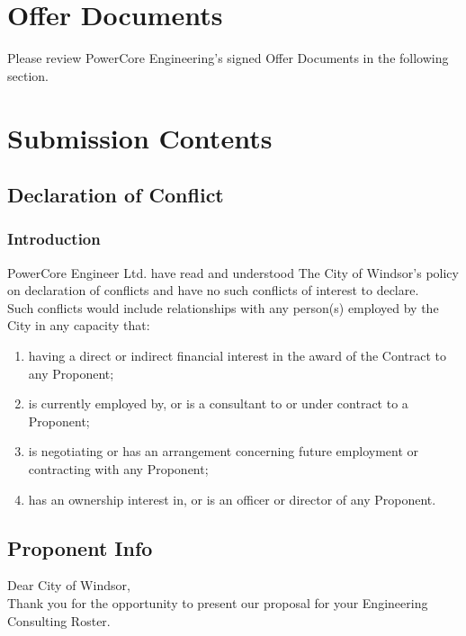 

\section{Offer Documents}
Please review PowerCore Engineering's signed Offer Documents in the following section. 


\section{Submission Contents}
\subsection{Declaration of Conflict}
\label{Sub:DOC}
\subsubsection{Introduction}
\label{Sub:DOC:intro}
PowerCore Engineer Ltd. have read and understood The City of Windsor's policy on declaration of conflicts and have no such conflicts of interest to declare.\\

Such conflicts would include relationships with any person(s) employed by the City in any capacity that:

\begin{enumerate}
	\item having a direct or indirect financial interest in the award of the Contract to any Proponent;
	\item is currently employed by, or is a consultant to or under contract to a Proponent;
	\item is negotiating or has an arrangement concerning future employment or contracting with any Proponent;
	\item has an ownership interest in, or is an officer or director of any Proponent.
\end{enumerate}
\pagebreak

\subsection{Proponent Info}
\label{Sub:PI}

\noindent Dear City of Windsor, \\



\noindent Thank you for the opportunity to present our proposal for your Engineering Consulting Roster.\\



